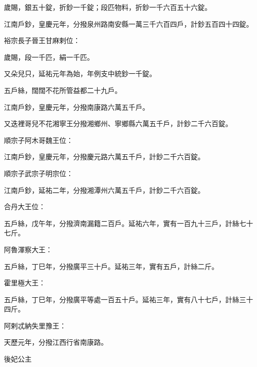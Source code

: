 \begin{pinyinscope}
 歲賜，銀五十錠，折鈔一千錠；段匹物料，折鈔一千六百五十六錠。



 江南戶鈔，皇慶元年，分撥泉州路南安縣一萬三千六百四戶，計鈔五百四十四錠。



 裕宗長子晉王甘麻剌位：



 歲賜，段一千匹，絹一千匹。



 又朵兒只，延祐元年為始，年例支中統鈔一千錠。



 五戶絲，闊闊不花所管益都二十九戶。



 江南戶鈔，皇慶元年，分撥南康路六萬五千戶。



 又迭裡哥兒不花湘寧王分撥湘鄉州、寧鄉縣六萬五千戶，計鈔二千六百錠。



 順宗子阿木哥魏王位：



 江南戶鈔，皇慶元年，分撥慶元路六萬五千戶，計鈔二千六百錠。



 順宗子武宗子明宗位：



 江南戶鈔，延祐二年，分撥湘潭州六萬五千戶，計鈔二千六百錠。



 合丹大王位：



 五戶絲，戊午年，分撥濟南漏籍二百戶。延祐六年，實有一百九十三戶，計絲七十七斤。



 阿魯渾察大王：



 五戶絲，丁巳年，分撥廣平三十戶。延祐三年，實有五戶，計絲二斤。



 霍里極大王：



 五戶絲，丁巳年，分撥廣平等處一百五十戶。延祐三年，實有八十七戶，計絲三十四斤。



 阿剌忒納失里豫王：



 天歷元年，分撥江西行省南康路。



 後妃公主




\end{pinyinscope}
